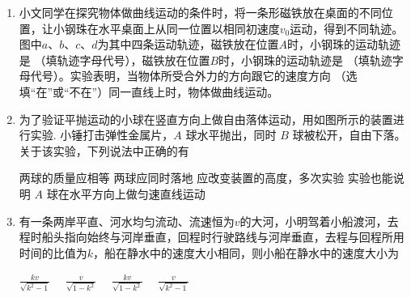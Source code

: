 

\begin{enumerate}[leftmargin=0em]
\renewcommand{\labelenumi}{\arabic{enumi}.}
\item
{}
小文同学在探究物体做曲线运动的条件时，将一条形磁铁放在桌面的不同位置，让小钢珠在水平桌面上从同一位置以相同初速度$ v_{0} $运动，得到不同轨迹。图中$ a $、$ b $、$ c $、$ d $为其中四条运动轨迹，磁铁放在位置$ A $时，小钢珠的运动轨迹是  （填轨迹字母代号），磁铁放在位置$ B $时，小钢珠的运动轨迹是  （填轨迹字母代号）。实验表明，当物体所受合外力的方向跟它的速度方向  （选填“在”或“不在”）同一直线上时，物体做曲线运动。
\begin{figure}[h!]
\centering

\end{figure}


\item 
{}
为了验证平抛运动的小球在竖直方向上做自由落体运动，用如图所示的装置进行实验. 小锤打击弹性金属片，$ A $ 球水平抛出，同时 $ B $ 球被松开，自由下落。 关于该实验，下列说法中正确的有  


\begin{minipage}[h!]{0.7\linewidth}
\vspace{0.3em}
\fourchoices
{两球的质量应相等}
{两球应同时落地}
{应改变装置的高度，多次实验}
{实验也能说明 $ A $ 球在水平方向上做匀速直线运动}


\vspace{0.3em}
\end{minipage}
\hfill
\begin{minipage}[h!]{0.3\linewidth}
\flushright
\vspace{0.3em}

\vspace{0.3em}
\end{minipage}


\item 
{}
有一条两岸平直、河水均匀流动、流速恒为$ v $的大河，小明驾着小船渡河，去程时船头指向始终与河岸垂直，回程时行驶路线与河岸垂直，去程与回程所用时间的比值为$ k $，船在静水中的速度大小相同，则小船在静水中的速度大小为  

\fourchoices
{$\frac { k v } { \sqrt { k ^ { 2 } - 1 } } \quad$}
{$\frac { v } { \sqrt { 1 - k ^ { 2 } } } \quad$}
{$\frac { k v } { \sqrt { 1 - k ^ { 2 } } } \quad$}
{$\frac { v } { \sqrt { k ^ { 2 } - 1 } }$}








\end{enumerate}
